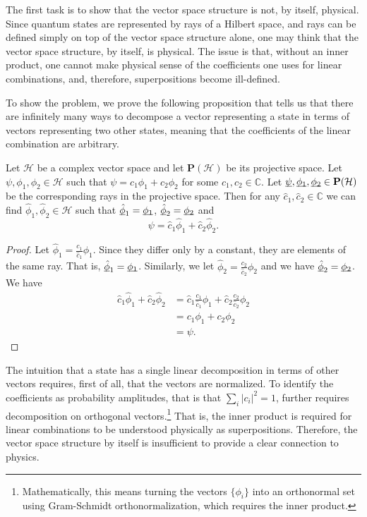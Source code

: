 \documentclass[10pt,twocolumn, nofootinbib]{revtex4-2}
\begin{document}
The first task is to show that the vector space structure is not, by itself, physical. Since quantum states are represented by rays of a Hilbert space, and rays can be defined simply on top of the vector space structure alone, one may think that the vector space structure, by itself, is physical. The issue is that, without an inner product, one cannot make physical sense of the coefficients one uses for linear combinations, and, therefore, superpositions become ill-defined.

To show the problem, we prove the following proposition that tells us that there are infinitely many ways to decompose a vector representing a state in terms of vectors representing two other states, meaning that the coefficients of the linear combination are arbitrary.
\begin{prop}\label{vector_insufficient} Let $\mathcal{H}$ be a complex vector space and let $\textbf{P}(\mathcal{H})$ be its projective space. Let $\psi, \phi_1, \phi_2 \in \mathcal{H}$ such that $\psi = c_1 \phi_1 + c_2 \phi_2$ for some $c_1, c_2 \in \mathbb{C}$. Let $\underbar{$\psi$}, \underbar{$\phi_1$}, \underbar{$\phi_2$} \in \textbf{P}(\mathcal{H})$ be the corresponding rays in the projective space. Then for any $\hat{c}_1, \hat{c}_2 \in \mathbb{C}$ we can find  $\hat{\phi}_1, \hat{\phi}_2 \in \mathcal{H}$ such that $\underbar{$\hat{\phi}$}_1 = \underbar{$\phi_1$}$, $\underbar{$\hat{\phi}$}_2 = \underbar{$\phi_2$}$ and
$$\psi = \hat{c}_1 \hat{\phi}_1 + \hat{c}_2 \hat{\phi}_2.$$
\end{prop}

\begin{proof}
Let $\hat{\phi}_1 = \frac{c_1}{\hat{c}_1} \phi_1$. Since they differ only by a constant, they are elements of the same ray. That is, $\underbar{$\hat{\phi}$}_1 = \underbar{$\phi_1$}$. Similarly, we let $\hat{\phi}_2 = \frac{c_2}{\hat{c}_2} \phi_2$ and we have $\underbar{$\hat{\phi}$}_2 = \underbar{$\phi_2$}$. We have
\begin{equation}
\begin{aligned}
\hat{c}_1 \hat{\phi}_1 + \hat{c}_2 \hat{\phi}_2 &= \hat{c}_1 \frac{c_1}{\hat{c}_1} \phi_1 + \hat{c}_2 \frac{c_2}{\hat{c}_2} \phi_2 \\
&= c_1 \phi_1 + c_2 \phi_2 \\
&= \psi.
\end{aligned}
\end{equation}
\end{proof}

The intuition that a state has a single linear decomposition in terms of other vectors requires, first of all, that the vectors are normalized. To identify the coefficients as probability amplitudes, that is that $\sum_i |c_i|^2 = 1$, further requires decomposition on orthogonal vectors.\footnote{Mathematically, this means turning the vectors $\{\phi_i\}$ into an orthonormal set using Gram-Schmidt orthonormalization, which requires the inner product.} That is, the inner product is required for linear combinations to be understood physically as superpositions. Therefore, the vector space structure by itself is insufficient to provide a clear connection to physics.
\end{document}
